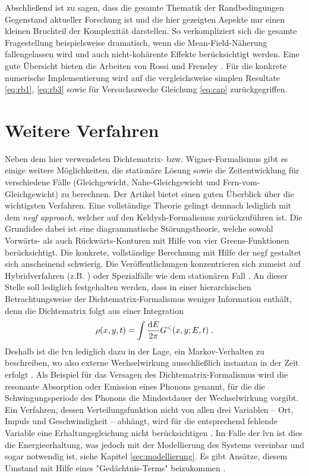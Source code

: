 Abschließend ist zu sagen, dass die gesamte Thematik der Randbedingungen Gegenstand aktueller Forschung ist und die hier gezeigten Aspekte nur einen kleinen Bruchteil der Komplexität darstellen. So verkompliziert sich die gesamte Fragestellung beispielsweise dramatisch, wenn die Mean-Field-Näherung fallengelassen wird und auch nicht-kohärente Effekte berücksichtigt werden. Eine gute Übersicht bieten die Arbeiten von Rossi \cite{buchRossi} und Frensley \cite{frensley}. Für die konkrete numerische Implementierung wird auf die vergleichsweise simplen Resultate \eqref{eq:rb1}, \eqref{eq:rb3} sowie für Versuchszwecke Gleichung \eqref{eq:cap} zurückgegriffen.

\section{Weitere Verfahren}\label{sec:weitere_verfahren}
Neben dem hier verwendeten Dichtematrix- bzw. Wigner-Formalismus gibt es einige weitere Möglichkeiten, die stationäre Lösung sowie die Zeitentwicklung für verschiedene Fälle (Gleichgewicht, Nahe-Gleichgewicht und Fern-vom-Gleichgewicht) zu berechnen. Der Artikel \cite{frensley3} bietet einen guten Überblick über die wichtigsten Verfahren. Eine vollständige Theorie gelingt demnach lediglich mit dem \emph{\ac{negf} approach}, welcher auf den Keldysh-Formalismus zurückzuführen ist. Die Grundidee dabei ist eine diagrammatische Störungstheorie, welche sowohl Vorwärts- als auch Rückwärts-Konturen mit Hilfe von vier Greens-Funktionen berücksichtigt. Die konkrete, vollständige Berechnung mit Hilfe der \ac{negf} gestaltet sich anscheinend schwierig. Die Veröffentlichungen konzentrieren sich zumeist auf Hybridverfahren (z.B. \cite{memory2, negf-dft}) oder Spezialfälle wie dem stationären Fall \cite{negf_datta}.
An dieser Stelle soll lediglich festgehalten werden, dass in einer hierarchischen Betrachtungsweise der Dichtematrix-Formalismus weniger Information enthält, denn die Dichtematrix folgt aus einer Integration
\begin{equation*}
  \rho(x,y,t) = \int \frac{\mathop{}\!\mathrm{d} E}{2\pi}G^{<}(x,y;E,t) \; .
\end{equation*}
Deshalb ist die \ac{lvn} lediglich dazu in der Lage, ein Markov-Verhalten zu beschreiben, wo also externe Wechselwirkung ausschließlich instantan in der Zeit erfolgt \cite{frensley3}. Als Beispiel für das Versagen des Dichtematrix-Formalismus wird die resonante Absorption oder Emission eines Phonons genannt, für die die Schwingungsperiode des Phonons die Mindestdauer der Wechselwirkung vorgibt. Ein Verfahren, dessen Verteilungsfunktion nicht von allen drei Variablen -- Ort, Impuls und Geschwindigkeit -- abhängt, wird für die entsprechend fehlende Variable eine Erhaltungsgleichung nicht berücksichtigen \cite{frensley3}. Im Falle der \ac{lvn} ist dies die Energieerhaltung, was jedoch mit der Modellierung des Systems vereinbar und sogar notwendig ist, siehe Kapitel \ref{sec:modellierung}. Es gibt Ansätze, diesem Umstand mit Hilfe eines "Gedächtnis-Terms" beizukommen \cite{memory1, memory2}.

